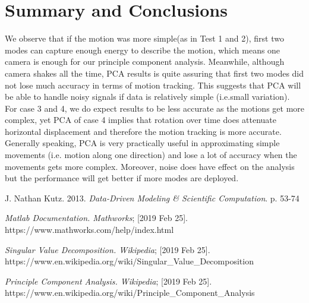 \documentclass[11pt,a4paper]{article}
\numberwithin{equation}{subsection}
\begin{document}
\section{Summary and Conclusions}
We observe that if the motion was more simple(as in Test 1 and 2), first two modes can capture enough energy to describe the motion, which means one camera is enough for our principle component analysis. Meanwhile, although camera shakes all the time, PCA results is quite assuring that first two modes did not lose much accuracy in terms of motion tracking. This suggests that PCA will be able to handle noisy signals if data is relatively simple (i.e.small variation).\\
For case 3 and 4, we do expect results to be less accurate as the motions get more complex, yet PCA of case 4 implies that rotation over time does attenuate horizontal displacement and therefore the motion tracking is more accurate.\\
Generally speaking, PCA is very practically useful in approximating simple movements (i.e. motion along one direction) and lose a lot of accuracy when the movements gets more complex. Moreover, noise does have effect on the analysis but the performance will get better if more modes are deployed.


\begin{thebibliography}{11}
	J. Nathan Kutz. 2013.
	\textit{Data-Driven Modeling \& Scientific Computation}. p. 53-74
	
	\textit{Matlab Documentation. Mathworks}; [2019 Feb 25]. \\https://www.mathworks.com/help/index.html

	\textit{Singular Value Decomposition. Wikipedia}; [2019 Feb 25]. \\https://www.en.wikipedia.org/wiki/Singular\_Value\_Decomposition

	\textit{Principle Component Analysis. Wikipedia}; [2019 Feb 25]. \\https://www.en.wikipedia.org/wiki/Principle\_Component\_Analysis
\end{thebibliography}
\end{document}
